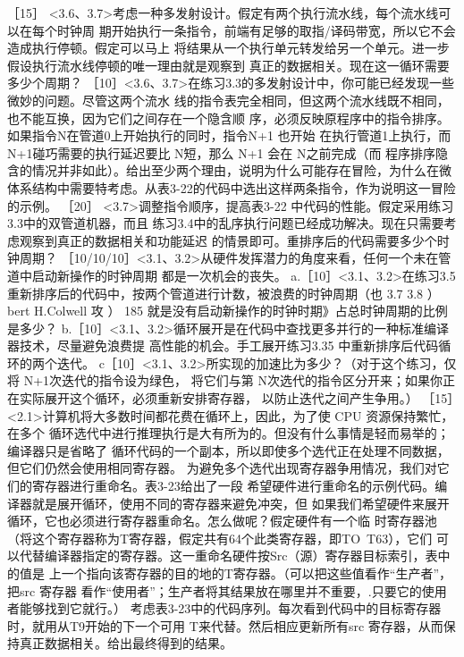［15］ <3.6、3.7>考虑一种多发射设计。假定有两个执行流水线，每个流水线可以在每个时钟周
期开始执行一条指令，前端有足够的取指/译码带宽，所以它不会造成执行停顿。假定可以马上
将结果从一个执行单元转发给另一个单元。进一步假设执行流水线停顿的唯一理由就是观察到
真正的数据相关。现在这一循环需要多少个周期？
［10］<3.6、3.7>在练习3.3的多发射设计中，你可能已经发现一些微妙的问题。尽管这两个流水
线的指令表完全相同，但这两个流水线既不相同，也不能互换，因为它们之间存在一个隐含顺
序，必须反映原程序中的指令排序。如果指令N在管道0上开始执行的同时，指令N+1 也开始
在执行管道1上执行，而 N+1碰巧需要的执行延迟要比 N短，那么 N+1 会在 N之前完成（而
程序排序隐含的情况并非如此）。给出至少两个理由，说明为什么可能存在冒险，为什么在微
体系结构中需要特考虑。从表3-22的代码中选出这样两条指令，作为说明这一冒险的示例。
［20］ <3.7>调整指令顺序，提高表3-22 中代码的性能。假定采用练习3.3中的双管道机器，而且
练习3.4中的乱序执行问题已经成功解决。现在只需要考虑观察到真正的数据相关和功能延迟
的情景即可。重排序后的代码需要多少个时钟周期？
［10/10/10］<3.1、3.2>从硬件发挥潜力的角度来看，任何一个未在管道中启动新操作的时钟周期
都是一次机会的丧失。
a.［10］<3.1、3.2>在练习3.5重新排序后的代码中，按两个管道进行计数，被浪费的时钟周期（也
3.7
3.8
）bert H.Colwell 攻 ）
185
就是没有启动新操作的时钟时期》占总时钟周期的比例是多少？
b.［10］<3.1、3.2>循环展开是在代码中查找更多并行的一种标准编译器技术，尽量避免浪费提
高性能的机会。手工展开练习3.35 中重新排序后代码循环的两个迭代。
c［10］<3.1、3.2>所实现的加速比为多少？（对于这个练习，仅将 N+1次迭代的指令设为绿色，
将它们与第 N次选代的指令区分开来；如果你正在实际展开这个循环，必须重新安排寄存器，
以防止迭代之间产生争用。）
［15］<2.1>计算机将大多数时间都花费在循环上，因此，为了使 CPU 资源保持繁忙，在多个
循环选代中进行推理执行是大有所为的。但没有什么事情是轻而易举的；编译器只是省略了
循环代码的一个副本，所以即使多个选代正在处理不同数据，但它们仍然会使用相同寄存器。
为避免多个选代出现寄存器争用情况，我们对它们的寄存器进行重命名。表3-23给出了一段
希望硬件进行重命名的示例代码。编译器就是展开循环，使用不同的寄存器来避免冲突，但
如果我们希望硬件来展开循环，它也必须进行寄存器重命名。怎么做呢？假定硬件有一个临
时寄存器池（将这个寄存器称为T寄存器，假定共有64个此类寄存器，即TO~T63），它们
可以代替编译器指定的寄存器。这一重命名硬件按Src（源）寄存器目标索引，表中的值是
上一个指向该寄存器的目的地的T寄存器。（可以把这些值看作“生产者”，把src 寄存器
看作“使用者”；生产者将其结果放在哪里并不重要，.只要它的使用者能够找到它就行。）
考虑表3-23中的代码序列。每次看到代码中的目标寄存器时，就用从T9开始的下一个可用
T来代替。然后相应更新所有src 寄存器，从而保持真正数据相关。给出最终得到的结果。
